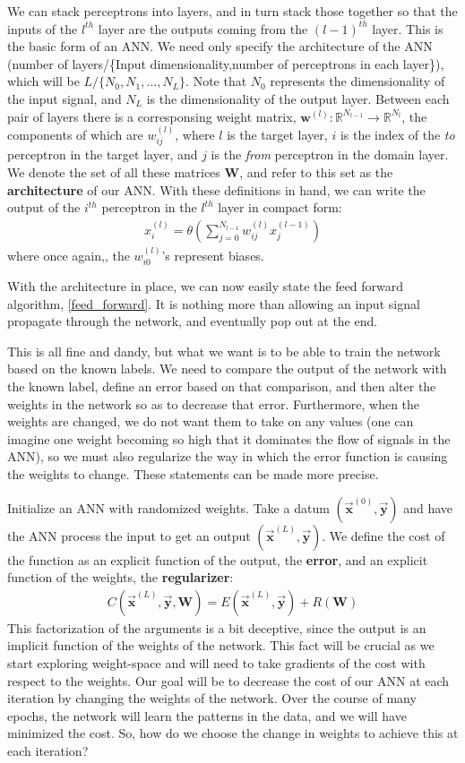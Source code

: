 \documentclass[prl,amsmath,amssymb,floatfix,superscriptaddress,notitlepage,twocolumn]{revtex4}
\newcommand{\ee}[1]{\begin{align} #1 \end{align}} 						%
\newcommand{\vc}[1]{\vec{\mathbf{#1}}} 								%
\begin{document}
We can stack perceptrons into layers, and in turn stack those together so that the inputs of the $l^{th}$ layer are the outputs coming from the $(l-1)^{th}$ layer. This is the basic form of an ANN. We need only specify the architecture of the ANN (number of layers/\{Input dimensionality,number of perceptrons in each layer\}), which will be $L/\{N_0,N_1,\dots,N_L\}$. Note that $N_0$ represents the dimensionality of the input signal, and $N_L$ is the dimensionality of the output layer. Between each pair of layers there is a corresponsing weight matrix, $\textbf{w}^{(l)}:\mathbb{R}^{N_{l-1}}\rightarrow\mathbb{R}^{N_l}$, the components of which are $w_{ij}^{(l)}$, where $l$ is the target layer, $i$ is the index of the \textit{to} perceptron in the target layer, and $j$ is the \textit{from} perceptron in the domain layer. We denote the set of all these matrices \textbf{W}, and refer to this set as the \textbf{architecture} of our ANN. With these definitions in hand, we can write the output of the $i^{th}$ perceptron in the $l^{th}$ layer in compact form:
\ee{
x^{(l)}_i=\theta(\sum_{j=0}^{N_{l-1}}w^{(l)}_{ij}x^{(l-1)}_j)
}
where once again,, the $w^{(l)}_{i0}$'s represent biases. 

With the architecture in place, we can now easily state the feed forward algorithm, \ref{feed_forward}. It is nothing more than allowing an input signal propagate through the network, and eventually pop out at the end.

This is all fine and dandy, but what we want is to be able to train the network based on the known labels. We need to compare the output of the network with the known label, define an error based on that comparison, and then alter the weights in the network so as to decrease that error. Furthermore, when the weights are changed, we do not want them to take on any values (one can imagine one weight becoming so high that it dominates the flow of signals in the ANN), so we must also regularize the way in which the error function is causing the weights to change. These statements can be made more precise.

Initialize an ANN with randomized weights. Take a datum $(\vc x^{(0)},\vc y)$ and have the ANN process the input to get an output $(\vc x^{(L)},\vc y)$. We define the cost of the function as an explicit function of the output, the \textbf{error}, and an explicit function of the weights, the \textbf{regularizer}:
\ee{\label{CostFactorization}
C(\vc x^{(L)},\vc y,\textbf{W})=E(\vc x^{(L)},\vc y)+R(\textbf{W})
}
This factorization of the arguments is a bit deceptive, since the output is an implicit function of the weights of the network. This fact will be crucial as we start exploring weight-space and will need to take gradients of the cost with respect to the weights. Our goal will be to decrease the cost of our ANN at each iteration by changing the weights of the network. Over the course of many epochs, the network will learn the patterns in the data, and we will have minimized the cost. So, how do we choose the change in weights to achieve this at each iteration?
\end{document}
